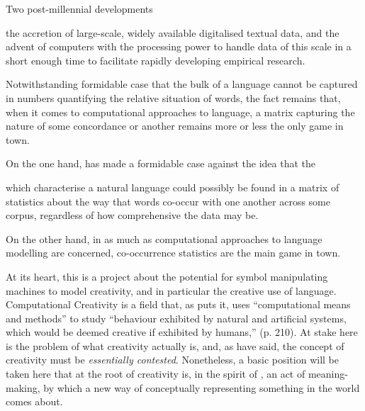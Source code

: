 Two post-millennial developments 

the accretion of large-scale, widely available digitalised textual data, and the advent of computers with the processing power to handle data of this scale in a short enough time to facilitate rapidly developing empirical research.

Notwithstanding  formidable case that the bulk of a language cannot be captured in numbers quantifying the relative situation of words, the fact remains that, when it comes to computational approaches to language, a matrix capturing the nature of some concordance or another remains more or less the only game in town.

On the one hand, \cite{Chomsky} has made a formidable case against the idea that the

which characterise a natural language could possibly be found in a matrix of statistics about the way that words co-occur with one another across some corpus, regardless of how comprehensive the data may be.

On the other hand, in as much as computational approaches to language modelling are concerned, co-occurrence statistics are the main game in town.


At its heart, this is a project about the potential for symbol manipulating machines to model creativity, and in particular the creative use of language.  Computational Creativity is a field that, as \cite{Wiggins2006b} puts it, uses ``computational means and methods'' to study ``behaviour exhibited by natural and artificial systems, which would be deemed creative if exhibited by humans,'' (p. 210).  At stake here is the problem of what creativity actually is, and, as \cite{Colton} have said, the concept of creativity must be \emph{essentially contested}.  Nonetheless, a basic position will be taken here that at the root of creativity is, in the spirit of \cite{Wittgenstein1953}, an act of meaning-making, by which a new way of conceptually representing something in the world comes about.

